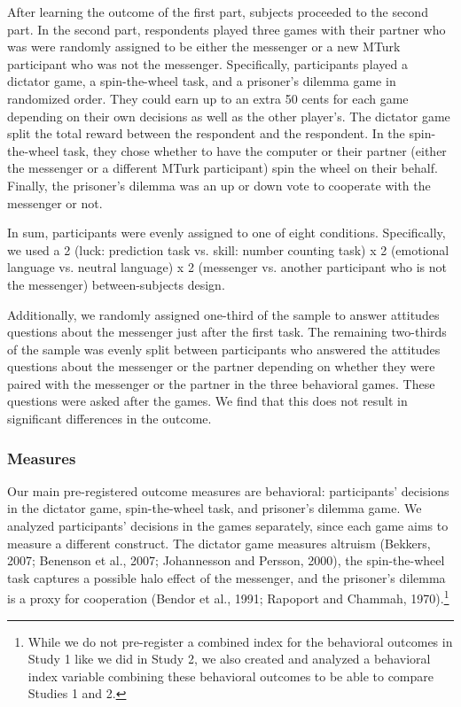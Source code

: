 After learning the outcome of the first part, subjects proceeded to the
second part. In the second part, respondents played three games with their
partner who was were randomly assigned to be either the messenger or a
new MTurk participant who was not the messenger. Specifically,
participants played a dictator game, a spin-the-wheel task, and a
prisoner's dilemma game in randomized order. They could earn
up to an extra 50 cents for each game depending on their own decisions
as well as the other player's. The dictator game split the total reward
between the respondent and the respondent. In the spin-the-wheel task,
they chose whether to have the computer or their partner (either the
messenger or a different MTurk participant) spin the wheel on their
behalf. Finally, the prisoner's dilemma was an up or down vote to
cooperate with the messenger or not.

In sum, participants were evenly assigned to one of eight conditions.
Specifically, we used a 2 (luck: prediction task vs. skill: number
counting task) x 2 (emotional language vs. neutral language) x 2
(messenger vs. another participant who is not the messenger)
between-subjects design.

Additionally, we randomly assigned one-third of the sample to answer
attitudes questions about the messenger just after the first task. The
remaining two-thirds of the sample was evenly split between participants
who answered the attitudes questions about the messenger or the partner
depending on whether they were paired with the messenger or the partner
in the three behavioral games. These questions were asked after the
games. We find that this does not result in significant
differences in the outcome.

\subsubsection{Measures}

Our main pre-registered outcome measures are behavioral: participants'
decisions in the dictator game, spin-the-wheel task, and prisoner's
dilemma game. We analyzed participants' decisions in the games
separately, since each game aims to measure a different construct. The
dictator game measures altruism (Bekkers, 2007; Benenson et al., 2007;
Johannesson and Persson, 2000), the spin-the-wheel task captures a
possible halo effect of the messenger, and the prisoner's dilemma is a
proxy for cooperation (Bendor et al., 1991; Rapoport and Chammah,
1970).\footnote{While we do not pre-register a combined index for the
  behavioral outcomes in Study 1 like we did in Study 2, we
  also created and analyzed a behavioral index variable combining these
  behavioral outcomes to be able to compare Studies 1 and 2.}


